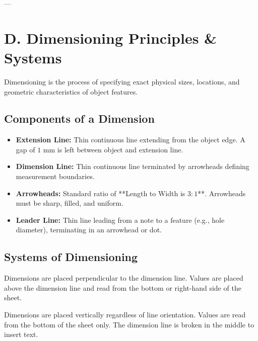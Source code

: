 ---

\section{D. Dimensioning Principles \& Systems}

Dimensioning is the process of specifying exact physical sizes, locations, and geometric characteristics of object features.

\subsection{Components of a Dimension}
\begin{itemize}
    \item \textbf{Extension Line:} Thin continuous line extending from the object edge. A gap of $1\text{ mm}$ is left between object and extension line.
    \item \textbf{Dimension Line:} Thin continuous line terminated by arrowheads defining measurement boundaries.
    \item \textbf{Arrowheads:} Standard ratio of **Length to Width is $3:1$**. Arrowheads must be sharp, filled, and uniform.
    \item \textbf{Leader Line:} Thin line leading from a note to a feature (e.g., hole diameter), terminating in an arrowhead or dot.
\end{itemize}

\subsection{Systems of Dimensioning}

\begin{definition}
Dimensions are placed perpendicular to the dimension line. Values are placed above the dimension line and read from the bottom or right-hand side of the sheet.
\end{definition}

\begin{definition}
Dimensions are placed vertically regardless of line orientation. Values are read from the bottom of the sheet only. The dimension line is broken in the middle to insert text.
\end{definition}

